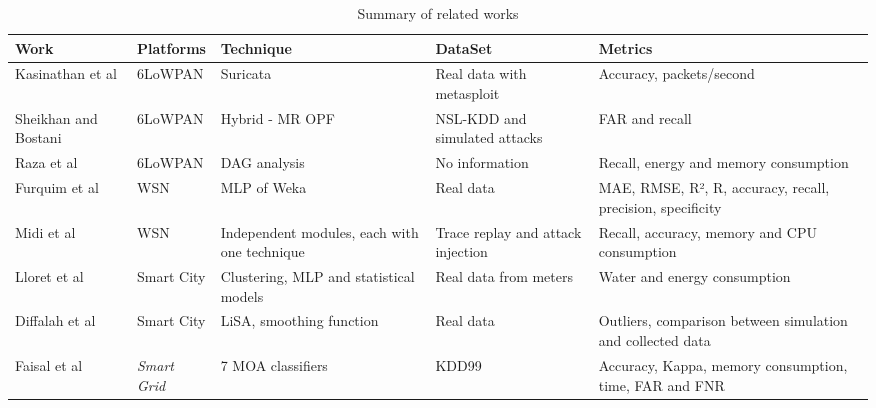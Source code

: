 \begin{table*}[htb]
	\caption{Summary of related works}
	\centering
	\begin{scriptsize}
		\begin{tabularx}{\textwidth}{l|l|X|X|X}	
			Work & Platforms & Technique & DataSet & Metrics\\
			\hline
			\hline
			Kasinathan et al\cite{dos-6lowpan-iot} & 6LoWPAN & Suricata & Real data with metasploit & Accuracy, packets/second\\
			\hline
			Sheikhan and Bostani\cite{Hybrid-ids-arch-iot} & 6LoWPAN & Hybrid - MR OPF & NSL-KDD and simulated attacks & FAR and recall\\
			\hline
			Raza et al\cite{SVELTE} & 6LoWPAN & DAG analysis & No information & Recall, energy and memory consumption\\
			\hline
			Furquim et al\cite{Fault-tolerance-disaster} & WSN & MLP of Weka & Real data & MAE, RMSE, R², R, accuracy, recall, precision, specificity\\
			\hline
			Midi et al\cite{Kalis} & WSN & Independent modules, each with one technique & Trace replay and attack injection & Recall, accuracy, memory and CPU consumption\\
			\hline
			Lloret et al\cite{IoT-arch-smartmeter} & Smart City & Clustering, MLP and statistical models & Real data from meters & Water and energy consumption\\
			\hline
			Diffalah et al\cite{scalable-anomaly-detection-smart-city} & Smart City & LiSA, smoothing function & Real data & Outliers, comparison between simulation and collected data\\
			\hline
			Faisal et al\cite{DS-based-IDS-SmartGrid} & \textit{Smart Grid} & 7 MOA classifiers & KDD99 & Accuracy, Kappa, memory consumption, time, FAR and FNR \\
			\hline
		\end{tabularx}
		\label{tab:summary}
	\end{scriptsize}
\end{table*}


